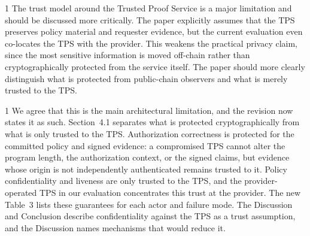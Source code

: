 \begin{reviewcomment}{1}
	The trust model around the Trusted Proof Service is a major limitation and should be discussed more critically.
	The paper explicitly assumes that the TPS preserves policy material and requester evidence, but the current evaluation even co-locates the TPS with the provider.
	This weakens the practical privacy claim, since the most sensitive information is moved off-chain rather than cryptographically protected from the service itself.
	The paper should more clearly distinguish what is protected from public-chain observers and what is merely trusted to the TPS.
\end{reviewcomment}

\begin{reviewresponse}{1}
	We agree that this is the main architectural limitation, and the revision now states it as such.
	Section~4.1 separates what is protected cryptographically from what is only trusted to the TPS.
	Authorization correctness is protected for the committed policy and signed evidence: a compromised TPS cannot alter the program length, the authorization context, or the signed claims, but evidence whose origin is not independently authenticated remains trusted to it.
	Policy confidentiality and liveness are only trusted to the TPS, and the provider-operated TPS in our evaluation concentrates this trust at the provider.
	The new Table~3 lists these guarantees for each actor and failure mode.
	The Discussion and Conclusion describe confidentiality against the TPS as a trust assumption, and the Discussion names mechanisms that would reduce it.

\end{reviewresponse}
